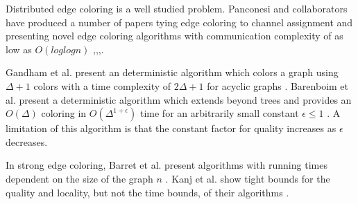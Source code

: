 Distributed edge coloring is a well studied problem. Panconesi and collaborators have produced a number of papers tying edge coloring to channel assignment and presenting novel edge coloring algorithms with communication complexity of as low as $O(log{log{n}})$ \cite{Grable:1997:NOD:314161.314266},\cite{Panconesi:1997:RDE:249364.249368},\cite{1041515},\cite{982945}.

Gandham et al. present an deterministic algorithm which colors a graph using $\Delta + 1$ colors with a time complexity of $2\Delta + 1$ for acyclic graphs \cite{1498534}. Barenboim et al. present a deterministic algorithm which extends beyond trees and provides an $O(\Delta)$ coloring in $O(\Delta^{1 + \epsilon})$ time for an arbitrarily small constant $\epsilon \le 1$ \cite{Barenboim:2011:DDE:1993806.1993825}. A limitation of this algorithm is that the constant factor for quality increases as $\epsilon$ decreases.

In strong edge coloring, Barret et al. present algorithms with running times dependent on the size of the graph $n$ \cite{1598948}. Kanj et al. show tight bounds for the quality and locality, but not the time bounds, of their algorithms \cite{Kanj:2009:LAE:1696884.1696902}.

